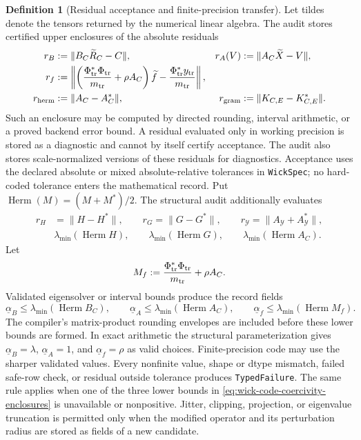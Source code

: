 \documentclass[11pt]{article}
\numberwithin{section}{part}
\theoremstyle{plain}
\theoremstyle{definition}
\newtheorem{definition}[definition]{Definition}
\theoremstyle{remark}
\begin{document}
\begin{definition}[Residual acceptance and finite-precision transfer]
\label{def:wick-residual-acceptance}
Let tildes denote the tensors returned by the numerical linear algebra.  The
audit stores certified upper enclosures of the absolute residuals
\begin{align}
 r_B&:=\|B_C\widetilde R_C-C\|,
 &r_A(V)&:=\|A_C\widetilde X-V\|,
 \label{eq:wick-code-solve-residuals}\\
 r_f&:=\left\|
 \left(\frac{\Phi_{\rm tr}^*\Phi_{\rm tr}}{m_{\rm tr}}+\rho A_C\right)
 \widetilde f-\frac{\Phi_{\rm tr}^*y_{\rm tr}}{m_{\rm tr}}
 \right\|,
 \label{eq:wick-code-krr-residual}\\
 r_{\rm herm}&:=\|A_C-A_C^*\|,
 &r_{\rm gram}&:=\|K_{C,E}-K_{C,E}^*\|.
 \label{eq:wick-code-structure-residuals}
\end{align}
Such an enclosure may be computed by directed rounding, interval arithmetic,
or a proved backend error bound.  A residual evaluated only in working
precision is stored as a diagnostic and cannot by itself certify acceptance.
The audit also stores scale-normalized versions of these residuals for
diagnostics.
Acceptance uses the declared absolute or mixed absolute-relative tolerances in
\texttt{WickSpec}; no hard-coded tolerance enters the mathematical record.
Put \(\operatorname{Herm}(M)=(M+M^*)/2\).  The structural audit additionally
evaluates
\begin{equation}
 \begin{aligned}
 r_H&=\|H-H^*\|,\qquad
 r_G=\|G-G^*\|,\qquad
 r_{\mathcal Y}=\|A_{\mathcal Y}+A_{\mathcal Y}^*\|,\\
 &\lambda_{\min}(\operatorname{Herm}H),\qquad
 \lambda_{\min}(\operatorname{Herm}G),\qquad
 \lambda_{\min}(\operatorname{Herm}A_C).
 \end{aligned}
 \label{eq:wick-code-compiler-audit}
\end{equation}
Let
\[
 M_f:=\frac{\Phi_{\rm tr}^*\Phi_{\rm tr}}{m_{\rm tr}}+\rho A_C.
\]
Validated eigensolver or interval bounds produce the record fields
\begin{equation}
 \underline\alpha_B\le
 \lambda_{\min}(\operatorname{Herm}B_C),\qquad
 \underline\alpha_A\le
 \lambda_{\min}(\operatorname{Herm}A_C),\qquad
 \underline\alpha_f\le
 \lambda_{\min}(\operatorname{Herm}M_f).
 \label{eq:wick-code-coercivity-enclosures}
\end{equation}
The compiler's matrix-product rounding envelopes are included before these
lower bounds are formed.  In exact arithmetic the structural parameterization
gives \(\underline\alpha_B=\lambda\),
\(\underline\alpha_A=1\), and
\(\underline\alpha_f=\rho\) as valid choices.  Finite-precision code may use
the sharper validated values.
Every nonfinite value, shape or dtype mismatch, failed safe-row check, or
residual outside tolerance produces \texttt{TypedFailure}.  The same rule
applies when one of the three lower bounds in
\eqref{eq:wick-code-coercivity-enclosures} is unavailable or nonpositive.
Jitter, clipping,
projection, or eigenvalue truncation is permitted only when the modified
operator and its perturbation radius are stored as fields of a new candidate.


\end{definition}
\end{document}
